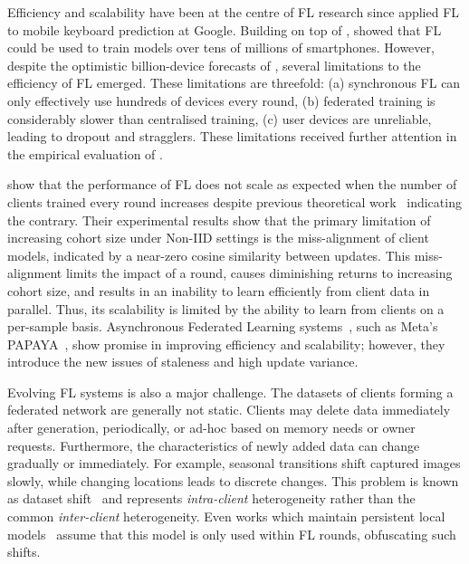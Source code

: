 Efficiency and scalability have been at the centre of FL research since \citet{GoogleKeyboard} applied FL to mobile keyboard prediction at Google. Building on top of \citet{GoogleKeyboard}, \citet{ScaleSystemDesign} showed that FL could be used to train models over tens of millions of smartphones. However, despite the optimistic billion-device forecasts of \citet{ScaleSystemDesign}, several limitations to the efficiency of FL emerged. These limitations are threefold: (a) synchronous FL can only effectively use hundreds of devices every round, (b) federated training is considerably slower than centralised training, (c) user devices are unreliable, leading to dropout and stragglers. These limitations received further attention in the empirical evaluation of \citet{LargeCohorts}.

\citet{LargeCohorts} show that the performance of FL does not scale as expected when the number of clients trained every round increases despite previous theoretical work~\citep{TighterTheory} indicating the contrary. Their experimental results show that the primary limitation of increasing cohort size under Non-IID settings is the miss-alignment of client models, indicated by a near-zero cosine similarity between updates. This miss-alignment limits the impact of a round, causes diminishing returns to increasing cohort size, and results in an inability to learn efficiently from client data in parallel. Thus, its scalability is limited by the ability to learn from clients on a per-sample basis. Asynchronous Federated Learning systems~\citep{AsynchronousFLonHetDevicesSurvey,FedBuff,AsyncrhonousOnlineFL,AsyncDropout}, such as Meta's PAPAYA~\citep{PAPAYA}, show promise in improving efficiency and scalability; however, they introduce the new issues of staleness and high update variance.

Evolving FL systems is also a major challenge. The datasets of clients forming a federated network are generally not static. Clients may delete data immediately after generation, periodically, or ad-hoc based on memory needs or owner requests. Furthermore, the characteristics of newly added data can change gradually or immediately. For example, seasonal transitions shift captured images slowly, while changing locations leads to discrete changes. This problem is known as dataset shift~\citep[sec. 3.1]{AdvancedAndOpenProblems} and represents \emph{intra-client} heterogeneity rather than the common \emph{inter-client} heterogeneity. Even works which maintain persistent local models~\citep{Ditto,FlWithPersonalisationLayers,AdaptivePersonalisedFederatedLearning,FederatedLearningMixtureOfGlobalAndLocal} assume that this model is only used within FL rounds, obfuscating such shifts.\\

